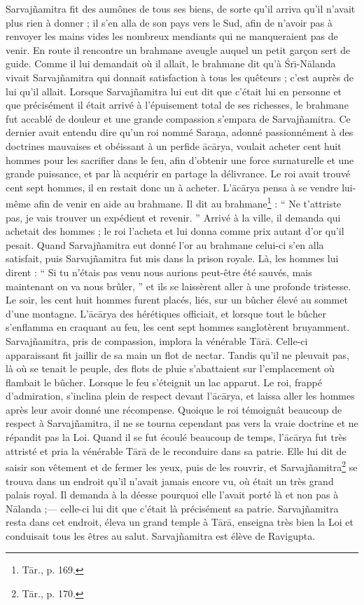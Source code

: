 \documentclass[a4paper, 11pt, oneside, french]{article}
\begin{document}
Sarvaj\~{n}amitra fit des aumônes de tous ses biens, de sorte qu'il arriva qu'il n'avait plus rien à donner ; il s'en alla de son pays vers le Sud, afin de n'avoir pas à renvoyer les mains vides les nombreux mendiants qui ne manqueraient pas de venir. En route il rencontre un brahmane aveugle auquel un petit garçon sert de guide. Comme il lui demandait où il allait, le brahmane dit qu'à \'{S}r\={\i}-N\={a}landa vivait Sarvaj\~{n}amitra qui donnait satisfaction à tous les quêteurs ; c'est auprès de lui qu'il allait. Lorsque Sarvaj\~{n}amitra lui eut dit que c'était lui en personne et que précisément il était arrivé à l'épuisement total de ses richesses, le brahmane fut accablé de douleur et une grande compassion s'empara de Sarvaj\~{n}amitra. Ce dernier avait entendu dire qu'un roi nommé Sara\d{n}a, adonné passionnément à des doctrines mauvaises et obéissant à un perfide \={a}c\={a}rya, voulait acheter cent huit hommes pour les sacrifier dans le feu, afin d'obtenir une force surnaturelle et une grande puissance, et par là acquérir en partage la délivrance. Le roi avait trouvé cent sept hommes, il en restait donc un à acheter. L'\={a}c\={a}rya pensa à se vendre lui-même afin de venir en aide au brahmane. Il dit au brahmane\footnote{T\={a}r., p. 169.} : `` Ne t'attriste pas, je vais trouver un expédient et revenir. '' Arrivé à la ville, il demanda qui achetait des hommes ; le roi l'acheta et lui donna comme prix autant d'or qu'il pesait. Quand Sarvaj\~{n}amitra eut donné l'or au brahmane celui-ci s'en alla satisfait, puis Sarvaj\~{n}amitra fut mis dans la prison royale. Là, les hommes lui dirent : `` Si tu n'étais pas venu nous aurions peut-être été sauvés, mais maintenant on va nous brûler, '' et ils se laissèrent aller à une profonde tristesse. Le soir, les cent huit hommes furent placés, liés, sur un bûcher élevé au sommet d'une montagne. L'\={a}c\={a}rya des hérétiques officiait, et lorsque tout le bûcher s'enflamma en craquant au feu, les cent sept hommes sanglotèrent bruyamment. Sarvaj\~{n}amitra, pris de compassion, implora la vénérable T\={a}r\={a}. Celle-ci apparaissant fit jaillir de sa main un flot de nectar. Tandis qu'il ne pleuvait pas, là où se tenait le peuple, des flots de pluie s'abattaient sur l'emplacement où flambait le bûcher. Lorsque le feu s'éteignit un lac apparut. Le roi, frappé d'admiration, s'inclina plein de respect devant l'\={a}c\={a}rya, et laissa aller les hommes après leur avoir donné une récompense. Quoique le roi témoignât beaucoup de respect à Sarvaj\~{n}amitra, il ne se tourna cependant pas vers la vraie doctrine et ne répandit pas la Loi. Quand il se fut écoulé beaucoup de temps, l'\={a}c\={a}rya fut très attristé et pria la vénérable T\={a}r\={a} de le reconduire dans sa patrie. Elle lui dit de saisir son vêtement et de fermer les yeux, puis de les rouvrir, et Sarvaj\~{n}amitra\footnote{T\={a}r., p. 170.} se trouva dans un endroit qu'il n'avait jamais encore vu, où était un très grand palais royal. Il demanda à la déesse pourquoi elle l'avait porté là et non pas à N\={a}landa ;--- celle-ci lui dit que c'était là précisément sa patrie. Sarvaj\~{n}amitra resta dans cet endroit, éleva un grand temple à T\={a}r\={a}, enseigna très bien la Loi et conduisait tous les êtres au salut. Sarvaj\~{n}amitra est élève de Ravigupta.
\end{document}

